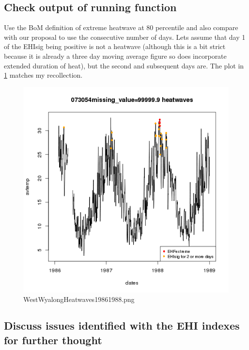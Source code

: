 \documentclass[a4paper]{article}
\begin{document}


\subsection{Check output of running function}
Use the BoM definition of extreme heatwave at 80 percentile and also compare with our proposal to use the consecutive number of days. Lets assume that day 1 of the EHIsig being positive is not a heatwave (although this is a bit strict because it is already a three day moving average figure so does incorporate extended duration of heat), but the second and subsequent days are.  The plot in \ref{fig:WestWyalongHeatwaves19861988.png} matches my recollection.

\begin{figure}[!h]
\centering
\includegraphics[width=\textwidth]{WestWyalongHeatwaves19861988.png}
\caption{WestWyalongHeatwaves19861988.png}
\label{fig:WestWyalongHeatwaves19861988.png}
\end{figure}
\clearpage

\subsection{ Discuss issues identified with the EHI indexes for further thought}
\end{document}
